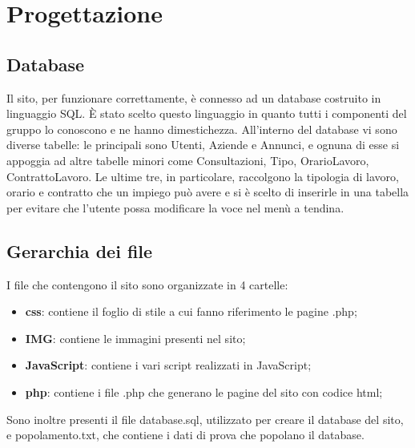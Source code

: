 \section{Progettazione}
	\subsection{Database}
Il sito, per funzionare correttamente, è connesso ad un database costruito in linguaggio SQL. È stato scelto questo linguaggio in quanto tutti i componenti del gruppo lo conoscono e ne hanno dimestichezza. 
All'interno del database vi sono diverse tabelle: le principali sono Utenti, Aziende e Annunci, e ognuna di esse si appoggia ad altre tabelle minori come Consultazioni, Tipo, OrarioLavoro, ContrattoLavoro. Le ultime tre, in particolare, raccolgono la tipologia di lavoro, orario e contratto che un impiego può avere e si è scelto di inserirle in una tabella per evitare che l'utente possa modificare la voce nel menù a tendina.   

\subsection{Gerarchia dei file}
I file che contengono il sito sono organizzate in 4 cartelle: 
\begin{itemize}
	\item \textbf{css}: contiene il foglio di stile a cui fanno riferimento le pagine .php;
	\item \textbf{IMG}: contiene le immagini presenti nel sito;
	\item \textbf{JavaScript}: contiene i vari script realizzati in JavaScript;
	\item \textbf{php}: contiene i file .php che generano le pagine del sito con codice html;
\end{itemize}
Sono inoltre presenti il file database.sql, utilizzato per creare il database del sito, e popolamento.txt, che contiene i dati di prova che popolano il database.


